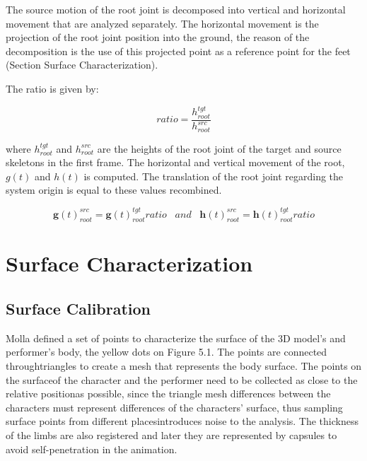 \documentclass{vgtc}
\begin{document}
The source motion of the root joint is decomposed into vertical and
horizontal movement that are analyzed separately. The horizontal
movement is the projection of the root joint position into the ground,
the reason of the decomposition is the use of this projected point as a
reference point for the feet (Section Surface Characterization).

The ratio is given by:

\begin{equation}
    \label{eq:heightratio}
    ratio = \frac{h_{root}^{tgt}}{h_{root}^{src}}
    \end{equation}

where \(h_{root}^{tgt}\) and \(h_{root}^{src}\) are the heights of the
root joint of the target and source skeletons in the first frame. The
horizontal and vertical movement of the root, \(g(t)\) and \(h(t)\) is
computed. The translation of the root joint regarding the system origin
is equal to these values recombined.

\begin{equation}
    \label{eq:rootmov}
    \mathbf{g}(t)_{root}^{src} = \mathbf{g}(t)_{root}^{tgt} ratio \hspace{10pt} and \hspace{10pt}
    \mathbf{h}(t)_{root}^{src} = \mathbf{h}(t)_{root}^{tgt} ratio
    \end{equation}


    \section{Surface Characterization}\label{surface-characterization}

\subsection{Surface Calibration}\label{surface-calibration}

Molla defined a set of points to characterize the surface of the 3D
model's and performer's body, the yellow dots on Figure 5.1. The points
are connected throughtriangles to create a mesh that represents the body
surface. The points on the surfaceof the character and the performer
need to be collected as close to the relative positionas possible, since
the triangle mesh differences between the characters must represent
differences of the characters' surface, thus sampling surface points
from different placesintroduces noise to the analysis. The thickness of
the limbs are also registered and later they are represented by capsules
to avoid self-penetration in the animation.
\end{document}
